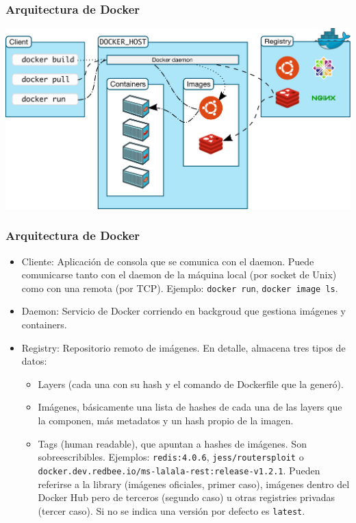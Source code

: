 \documentclass[xcolor={dvipsnames}]{beamer}
\begin{document}
\begin{frame}[fragile]
	\frametitle{Arquitectura de Docker}
	\centering
		\includegraphics[width=\textwidth]{assets/architecture.png}
\end{frame}

\begin{frame}[fragile]
	\frametitle{Arquitectura de Docker}
	\begin{itemize}
		\item \footnotesize Cliente: Aplicación de consola que se comunica con el daemon. Puede comunicarse tanto con el daemon de la máquina local (por socket de Unix) como con una remota (por TCP). Ejemplo: \texttt{docker run}, \texttt{docker image ls}.
		\item \footnotesize Daemon: Servicio de Docker corriendo en backgroud que gestiona imágenes y containers.
		\item \footnotesize Registry: Repositorio remoto de imágenes. En detalle, almacena tres tipos de datos:
		\begin{itemize}
			\item \footnotesize Layers (cada una con su hash y el comando de Dockerfile que la generó).
			\item \footnotesize Imágenes, básicamente una lista de hashes de cada una de las layers que la componen, más metadatos y un hash propio de la imagen.
			\item \footnotesize Tags (human readable), que apuntan a hashes de imágenes. Son sobreescribibles. Ejemplos: \texttt{redis:4.0.6}, \texttt{jess/routersploit} o \texttt{docker.dev.redbee.io/ms-lalala-rest:release-v1.2.1}. Pueden referirse a la library (imágenes oficiales, primer caso), imágenes dentro del Docker Hub pero de terceros (segundo caso) u otras registries privadas (tercer caso). Si no se indica una versión por defecto es \texttt{latest}.
		\end{itemize}
	\end{itemize}
\end{frame}
\end{document}
